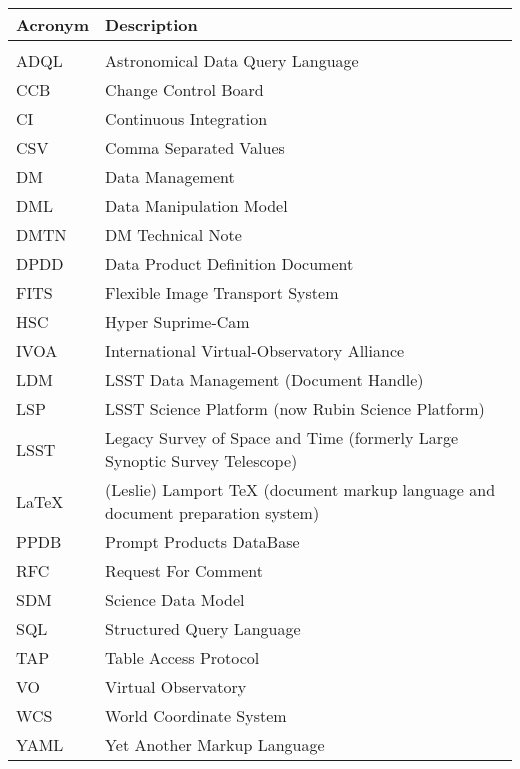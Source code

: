 \addtocounter{table}{-1}
\begin{longtable}{p{}p{}}\hline
\textbf{Acronym} & \textbf{Description}  \\\hline

 &  \\\hline
ADQL & Astronomical Data Query Language \\\hline
CCB & Change Control Board \\\hline
CI & Continuous Integration \\\hline
CSV & Comma Separated Values \\\hline
DM & Data Management \\\hline
DML & Data Manipulation Model \\\hline
DMTN & DM Technical Note \\\hline
DPDD & Data Product Definition Document \\\hline
FITS & Flexible Image Transport System \\\hline
HSC & Hyper Suprime-Cam \\\hline
IVOA & International Virtual-Observatory Alliance \\\hline
LDM & LSST Data Management (Document Handle) \\\hline
LSP & LSST Science Platform (now Rubin Science Platform) \\\hline
LSST & Legacy Survey of Space and Time (formerly Large Synoptic Survey Telescope) \\\hline
LaTeX & (Leslie) Lamport TeX (document markup language and document preparation system) \\\hline
PPDB & Prompt Products DataBase \\\hline
RFC & Request For Comment \\\hline
SDM & Science Data Model \\\hline
SQL & Structured Query Language \\\hline
TAP & Table Access Protocol \\\hline
VO & Virtual Observatory \\\hline
WCS & World Coordinate System \\\hline
YAML & Yet Another Markup Language \\\hline
\end{longtable}
